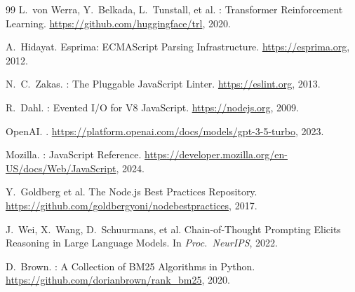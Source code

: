 \documentclass[runningheads]{llncs}
\begin{document}
\begin{thebibliography}{99}
  L.\ von Werra, Y.\ Belkada, L.\ Tunstall, et al.
  : Transformer Reinforcement Learning.
  \newblock \url{https://github.com/huggingface/trl}, 2020.

  A.\ Hidayat.
  \newblock Esprima: ECMAScript Parsing Infrastructure.
  \newblock \url{https://esprima.org}, 2012.

  N.\ C.\ Zakas.
  : The Pluggable JavaScript Linter.
  \newblock \url{https://eslint.org}, 2013.

  R.\ Dahl.
  : Evented I/O for V8 JavaScript.
  \newblock \url{https://nodejs.org}, 2009.

  OpenAI.
  .
  \newblock \url{https://platform.openai.com/docs/models/gpt-3-5-turbo}, 2023.

  Mozilla.
  : JavaScript Reference.
  \newblock \url{https://developer.mozilla.org/en-US/docs/Web/JavaScript}, 2024.

  Y.\ Goldberg et al.
  \newblock The {Node.js} Best Practices Repository.
  \newblock \url{https://github.com/goldbergyoni/nodebestpractices}, 2017.

  J.\ Wei, X.\ Wang, D.\ Schuurmans, et al.
  \newblock Chain-of-Thought Prompting Elicits Reasoning in Large Language Models.
  \newblock In \emph{Proc.\ NeurIPS}, 2022.

  D.\ Brown.
  : A Collection of BM25 Algorithms in Python.
  \newblock \url{https://github.com/dorianbrown/rank_bm25}, 2020.

\end{thebibliography}
\end{document}

